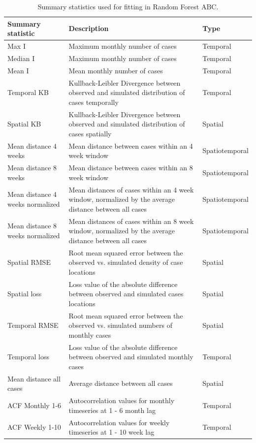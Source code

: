 \documentclass[
  oneside]{book}
\begin{document}
\begin{table}
\caption{\label{tab:tbsstats}Summary statistics used for fitting in Random Forest ABC.}
\centering
\begin{tabu} to 
\toprule
Summary statistic & Description & Type\\
\midrule
Max I & Maximum monthly number of cases & Temporal\\
Median I & Maximum monthly number of cases & Temporal\\
Mean I & Mean monthly number of cases & Temporal\\
Temporal KB & Kullback-Leibler Divergence between observed and simulated distribution of cases temporally & Temporal\\
Spatial KB & Kullback-Leibler Divergence between observed and simulated distribution of cases spatially & Spatial\\
\addlinespace
Mean distance 4 weeks & Mean distance between cases within an 4 week window & Spatiotemporal\\
Mean distance 8 weeks & Mean distance between cases within an 8 week window & Spatiotemporal\\
Mean distance 4 weeks normalized & Mean distances of cases within an 4 week window, normalized by the average distance between all cases & Spatiotemporal\\
Mean distance 8 weeks normalized & Mean distances of cases within an 8 week window, normalized by the average distance between all cases & Spatiotemporal\\
Spatial RMSE & Root mean squared error between the observed vs. simulated density of case locations & Spatial\\
\addlinespace
Spatial loss & Loss value of the absolute difference between observed and simulated cases locations & Spatial\\
Temporal RMSE & Root mean squared error between the observed vs. simulated numbers of monthly cases & Spatial\\
Temporal loss & Loss value of the absolute difference between observed and simulated monthly cases & Temporal\\
Mean distance all cases & Average distance between all cases & Spatial\\
ACF Monthly 1-6 & Autocorrelation values for monthly timeseries at 1 - 6 month lag & Temporal\\
\addlinespace
ACF Weekly 1-10 & Autocorrelation values for weekly timeseries at 1 - 10 week lag & Temporal\\
\bottomrule
\end{tabu}
\end{table}
\end{document}
